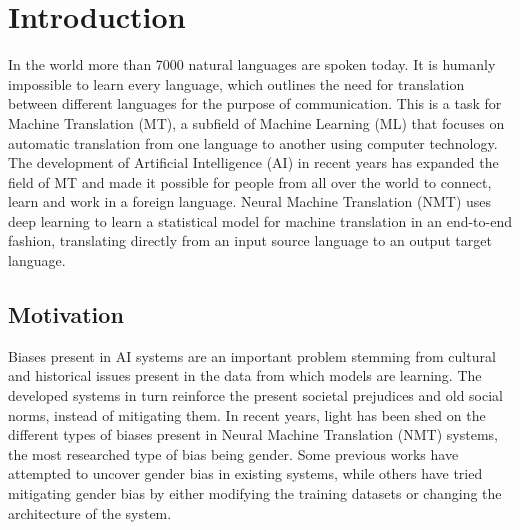 \chapter{Introduction}
\label{ch:Introduction}



In the world more than 7000 natural languages are spoken today. It is humanly impossible to learn every language, which outlines the need for translation between different languages for the purpose of communication. This is a task for Machine Translation (MT), a subfield of Machine Learning (ML) that focuses on automatic translation from one language to another using computer technology. The development of Artificial Intelligence (AI) in recent years has expanded the field of MT and made it possible for people from all over the world to connect, learn and work in a foreign language. 
Neural Machine Translation (NMT) uses deep learning to learn a statistical model for machine translation in an end-to-end fashion, translating directly from an input source language to an output target language. 




\section{Motivation}
\label{sec:Introduction:Motivation}

Biases present in AI systems are an important problem stemming from cultural and historical issues present in the data from which models are learning. The developed systems in turn reinforce the present societal prejudices and old social norms, instead of mitigating them.
In recent years, light has been shed on the different types of biases present in Neural Machine Translation (NMT) systems, the most researched type of bias being gender. Some previous works have attempted to uncover gender bias in existing systems, while others have tried mitigating gender bias by either modifying the training datasets or changing the architecture of the system.


